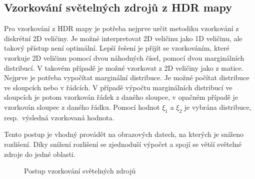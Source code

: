 \documentclass[czech,master]{diploma}
\newcommand{\randU}{\xi_{1}}
\newcommand{\randV}{\xi_{2}}
\begin{document}
\subsection{Vzorkování světelných zdrojů z HDR mapy}
Pro vzorkování z HDR mapy je potřeba nejprve určit metodiku vzorkování z diskrétní 2D veličiny. Je možné interpretovat 2D veličinu jako 1D veličinu, ale takový přístup není optimální. Lepší řešení je přijít se vzorkováním, které vzorkuje 2D veličinu pomocí dvou náhodných čísel, pomocí dvou marginálních distribucí. V takovém případě je možné vzorkovat z 2D veličiny jako z matice. Nejprve je potřeba vypočítat marginální distribuce. Je možné počítat distribuce ve sloupcích nebo v řádcích. V případě výpočtu marginálních distribucí ve sloupcích je potom vzorkován řádek z daného sloupce, v opačném případě je vzorkován sloupec z daného řádku. Pomocí hodnot \(\randU\) a \(\randV\) je vybrána distribuce, resp.\ výsledná vzorkovaná hodnota.~\cite{PHARR2017747}\par
Tento postup je vhodný provádět na obrazových datech, na kterých je sníženo rozlišení. Díky snížení rozlišení se zjednoduší výpočet a spojí se větší světelné zdroje do jedné oblasti.


\begin{figure}[ht]%
  \centering
  \qquad
  \caption{Postup vzorkování světelných zdrojů~\cite{PHARR2017747}}%
  \label{fig:lightsSampling}%
\end{figure}
\end{document}
